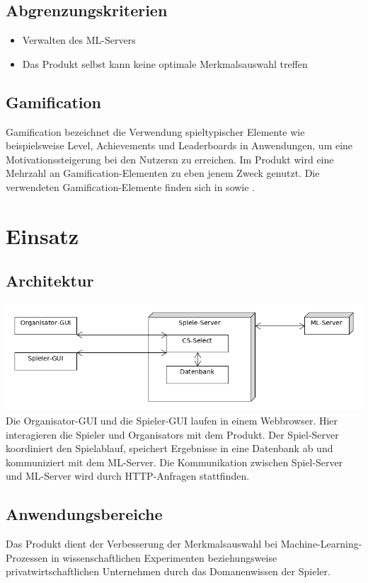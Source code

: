 \documentclass[a4paper]{scrreprt}
\begin{document}
    \section{Abgrenzungskriterien}
    \begin{itemize}
        \item Verwalten des \Gls{ML-Server}s
	    \item Das \Gls{Produkt} selbst kann keine optimale Merkmalsauswahl treffen
    \end{itemize}

    \section{Gamification}
    \label{sec:gamification}
    Gamification bezeichnet die Verwendung spieltypischer Elemente wie beispielsweise Level, \Glspl{Achievement} und Leaderboards in Anwendungen, um eine Motivationssteigerung bei den \Glspl{Nutzer}n zu erreichen.
    Im \Gls{Produkt} wird eine Mehrzahl an Gamification-Elementen zu eben jenem Zweck genutzt.
    Die verwendeten Gamification-Elemente finden sich in  sowie .

    
    \chapter{Einsatz}

    \section{Architektur}
    \includegraphics[width=\textwidth]{uml/export/Architektur.png}
    Die \Gls{Organisator}-GUI und die \Gls{Spieler}-GUI laufen in einem \Gls{Webbrowser}.
    Hier interagieren die \Gls{Spieler} und \Glspl{Organisator} mit dem \Gls{Produkt}.
    Der \Gls{Spiel-Server} koordiniert den Spielablauf, speichert Ergebnisse
    in eine Datenbank ab und kommuniziert mit dem \Gls{ML-Server}.
    Die Kommunikation zwischen \Gls{Spiel-Server} und \Gls{ML-Server} wird durch HTTP-Anfragen stattfinden.
    \section{Anwendungsbereiche}
    Das \Gls{Produkt} dient der Verbesserung der Merkmalsauswahl bei Machine-Learning-Prozessen in wissenschaftlichen
    Experimenten beziehungsweise privatwirtschaftlichen Unternehmen durch das \Gls{Domanenwissen} der \Gls{Spieler}.
\end{document}
